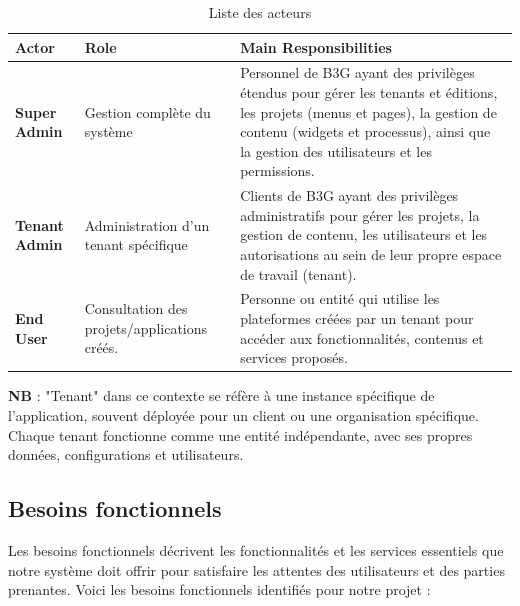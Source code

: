  
\begin{table}[h]
\centering
\captionsetup{justification=centering}
\begin{tabular}{|p{}|p{}|p{}|}
\hline
\textbf{Actor} & \textbf{Role} & \textbf{Main Responsibilities} \\ \hline
\textbf{Super Admin} & Gestion complète du système & Personnel de B3G ayant des privilèges étendus pour gérer les tenants et éditions, les projets (menus et pages), la gestion de contenu (widgets et processus), ainsi que la gestion des utilisateurs et les permissions. \\ \hline
\textbf{Tenant Admin} & Administration d’un tenant spécifique & Clients de B3G ayant des privilèges administratifs pour gérer les projets, la gestion de contenu, les utilisateurs et les autorisations au sein de leur propre espace de travail (tenant). \\ \hline
\textbf{End User} & Consultation des projets/applications créés. & Personne ou entité qui utilise les plateformes créées par un tenant pour accéder aux fonctionnalités, contenus et services proposés. \\ \hline
\end{tabular}
\caption{Liste des acteurs}
\label{tab:actors}
\end{table}

\textbf{NB} : "Tenant" dans ce contexte se réfère à une instance spécifique de l’application, souvent déployée pour un client ou une organisation spécifique. Chaque tenant fonctionne comme une entité indépendante, avec ses propres données, configurations et utilisateurs.

\subsection{Besoins fonctionnels}

\hspace{\parindent} Les besoins fonctionnels décrivent les fonctionnalités et les services essentiels que notre système doit offrir pour satisfaire les attentes des utilisateurs et des parties prenantes. Voici les besoins fonctionnels identifiés pour notre projet :

